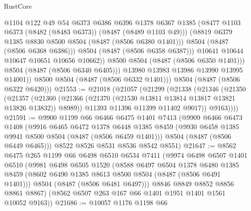 \begin{lexlean}{RustCore}
\begin{coremodule}
                        @1104
                        @122
                        @49
                        @54
                        @6373
                        @6386
                        @6396
                        @1378
                        @6367
                        @1385
                        (@8477 @1103 @6373 (@8482 (@8483 @6373)) (@8487 (@8489 @1103 @49)))
                        (@8819 @6379 @1385 @8830 @8500 @8504 (@8487 (@8506 @6380 @1401)))
                        @8504
                        (@8487 (@8506 @6368 @6386)))
                      @8504
                      (@8487 (@8506 @6358 @6387)))
                    @10641
                    @10644
                    @10647
                    @10651
                    @10656
                    @10662))
                @8500
                @8504
                (@8487 (@8506 @6350 @1401)))
              @8504
              (@8487 (@8506 @6340 @6405)))
            @13980
            @13983
            @13986
            @13990
            @13995
            @14001))
        @8500
        @8504
        (@8487 (@8506 @6332 @1401)))
      @8504
      (@8487 (@8506 @6322 @6420)))
@21553 := @21018
    (@21057
      (@21299
        (@21338
          (@21346
            (@21350
              (@21357
                (@21360 (@21366 (@21370 (@21530 @13811 @13814 @13817 @13821 @13826 @13832)) @8989))
                @11393
                @11396
                @11399
                @11402
                @9017))
            @9163))))
@21591 := @9900
    @1199
    @66
    @6466
    @6475
    @1401
    @7413
    (@9909
      @6466
      @6473
      @1408
      (@9916
        @6465
        @6472
        @1378
        @6448
        @1385
        @8459
        (@9930 @6458 @1385 @9941 @8500 @8504 (@8487 (@8506 @6459 @1401)))
        @8504
        (@8487 (@8506 @6449 @6465)))
      @8522
      @8526
      @8531
      @8536
      @8542
      @8551)
@21647 := @8562
    @6475
    @265
    @1199
    @66
    @6498
    @6510
    @6534
    @7411
    (@9974
      @6498
      @6507
      @1401
      @6510
      (@9981
        @6498
        @6505
        @1520
        (@8588
          @6497
          @6504
          @1378
          @6480
          @1385
          @8459
          (@8602 @6490 @1385 @8613 @8500 @8504 (@8487 (@8506 @6491 @1401)))
          @8504
          (@8487 (@8506 @6481 @6497)))
        @8846
        @8849
        @8852
        @8856
        @8861
        @8867)
      (@8562 @6507 @263 @167 @66 @1401 @1951 @1401 @1561 @10052 @9163))
@21686 := @10057
    @1176
    @1198
    @66

\end{coremodule}
\end{lexlean}
